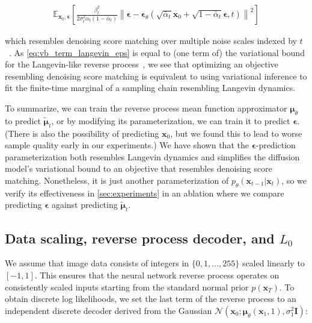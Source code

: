 \begin{align}
    \mathbb{E}_{\mathbf{x}_0, {\boldsymbol{\epsilon}}}\!\left[ \frac{\beta_t^2}{2\sigma_t^2 \alpha_t (1-\bar\alpha_t)}  \left\| {\boldsymbol{\epsilon}} - {\boldsymbol{\epsilon}}_\theta(\sqrt{\bar\alpha_t} \mathbf{x}_0 + \sqrt{1-\bar\alpha_t}{\boldsymbol{\epsilon}}, t) \right\|^2\right] \label{eq:vb_term_langevin_eps}
\end{align}

which resembles denoising score matching over multiple noise scales indexed by $t$~\citep{song2019generative}. As \ref{eq:vb_term_langevin_eps} is equal to (one term of) the variational bound for the Langevin-like reverse process~, we see that optimizing an objective resembling denoising score matching is equivalent to using variational inference to fit the finite-time marginal of a sampling chain resembling Langevin dynamics.

To summarize, we can train the reverse process mean function approximator ${\boldsymbol{\mu}}_\theta$ to predict $\tilde{\boldsymbol{\mu}}_t$, or by modifying its parameterization, we can train it to predict ${\boldsymbol{\epsilon}}$. (There is also the possibility of predicting $\mathbf{x}_0$, but we found this to lead to worse sample quality early in our experiments.) We have shown that the  ${\boldsymbol{\epsilon}}$-prediction parameterization both resembles Langevin dynamics and simplifies the diffusion model's variational bound to an objective that resembles denoising score matching. Nonetheless, it is just another parameterization of $p_\theta(\mathbf{x}_{t-1}|\mathbf{x}_t)$, so we verify its effectiveness in \ref{sec:experiments} in an ablation where we compare predicting ${\boldsymbol{\epsilon}}$ against predicting $\tilde{\boldsymbol{\mu}}_t$.

\algrenewcommand\algorithmicindent{0.5em}

\subsection[Data scaling and reverse process decoder]{Data scaling, reverse process decoder, and $L_0$} We assume that image data consists of integers in $\{ 0, 1, \dotsc, 255\}$ scaled linearly to $[-1, 1]$. This ensures that the neural network reverse process operates on consistently scaled inputs starting from the standard normal prior $p(\mathbf{x}_T)$.
To obtain discrete log likelihoods, we set the last term of the reverse process to an independent discrete decoder derived from the Gaussian $\mathcal{N}(\mathbf{x}_0 ; {\boldsymbol{\mu}}_\theta(\mathbf{x}_1, 1), \sigma_1^2 \mathbf{I})$:


